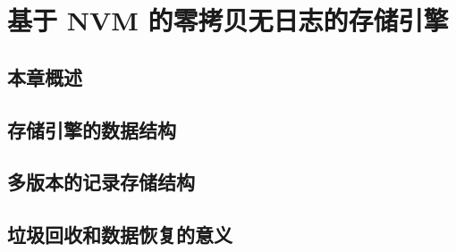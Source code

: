 
\chapter{基于 NVM 的零拷贝无日志的存储引擎}

\section{本章概述}

\section{存储引擎的数据结构}

\section{多版本的记录存储结构}

\section{垃圾回收和数据恢复的意义}
